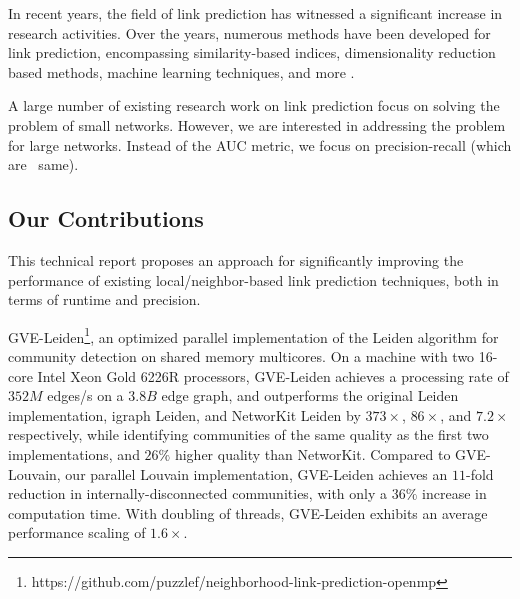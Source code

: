In recent years, the field of link prediction has witnessed a significant increase in research activities. Over the years, numerous methods have been developed for link prediction, encompassing similarity-based indices, dimensionality reduction based methods, machine learning techniques, and more \cite{arrar2023comprehensive}.

A large number of existing research work on link prediction focus on solving the problem of small networks. However, we are interested in addressing the problem for large networks. Instead of the AUC metric, we focus on precision-recall (which are ~same).




\subsection{Our Contributions}

This technical report proposes an approach for significantly improving the performance of existing local/neighbor-based link prediction techniques, both in terms of runtime and precision.

GVE-Leiden\footnote{https://github.com/puzzlef/neighborhood-link-prediction-openmp}, an optimized parallel implementation of the Leiden algorithm for community detection on shared memory multicores. On a machine with two 16-core Intel Xeon Gold 6226R processors, GVE-Leiden achieves a processing rate of $352 M$ edges/s on a $3.8 B$ edge graph, and outperforms the original Leiden implementation, igraph Leiden, and NetworKit Leiden by $373\times$, $86\times$, and $7.2\times$ respectively, while identifying communities of the same quality as the first two implementations, and $26\%$ higher quality than NetworKit. Compared to GVE-Louvain, our parallel Louvain implementation, GVE-Leiden achieves an $11$-fold reduction in internally-disconnected communities, with only a $36\%$ increase in computation time. With doubling of threads, GVE-Leiden exhibits an average performance scaling of $1.6\times$.





